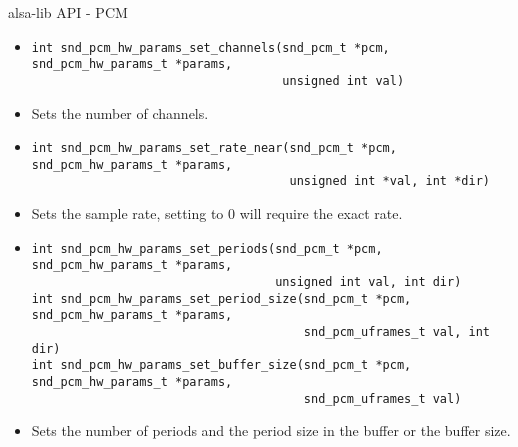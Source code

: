\begin{frame}[fragile]{alsa-lib API - PCM}
  \begin{itemize}
  \item
    \begin{block}{}
    \fontsize{9}{9}\selectfont
      \begin{verbatim}
int snd_pcm_hw_params_set_channels(snd_pcm_t *pcm, snd_pcm_hw_params_t *params,
                                   unsigned int val)
      \end{verbatim}
    \end{block}
    \item Sets the number of channels.
  \item
    \begin{block}{}
    \fontsize{9}{9}\selectfont
      \begin{verbatim}
int snd_pcm_hw_params_set_rate_near(snd_pcm_t *pcm, snd_pcm_hw_params_t *params,
                                    unsigned int *val, int *dir)
      \end{verbatim}
    \end{block}
    \item Sets the sample rate, setting  to 0 will require
      the exact rate.
  \item
    \begin{block}{}
    \fontsize{9}{9}\selectfont
      \begin{verbatim}
int snd_pcm_hw_params_set_periods(snd_pcm_t *pcm, snd_pcm_hw_params_t *params,
                                  unsigned int val, int dir)
int snd_pcm_hw_params_set_period_size(snd_pcm_t *pcm, snd_pcm_hw_params_t *params,
                                      snd_pcm_uframes_t val, int dir)
int snd_pcm_hw_params_set_buffer_size(snd_pcm_t *pcm, snd_pcm_hw_params_t *params,
                                      snd_pcm_uframes_t val)
      \end{verbatim}
    \end{block}
  \item Sets the number of periods and the period size in the
      buffer or the buffer size.
  \end{itemize}
\end{frame}

